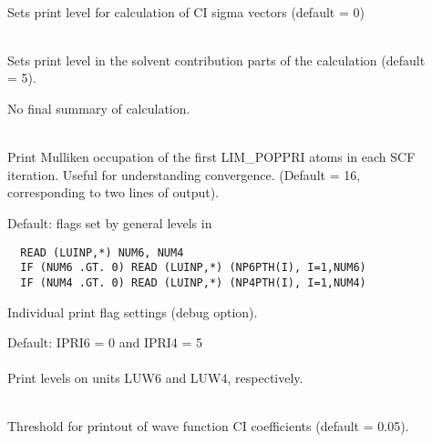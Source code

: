 \begin{description}
\item[]
   \\
  Sets print level for calculation of CI sigma vectors (default = 0)

\item[]
   \\
  Sets print level in the solvent contribution parts of the
  calculation (default = 5).

\item[]
  No final summary of calculation.

\item[]
   \\
  Print Mulliken occupation of the first LIM\_POPPRI atoms in
  each SCF iteration. Useful for understanding convergence.
  (Default = 16, corresponding to two lines of output).

\item[]
 Default: flags set by general levels in 
\begin{verbatim}
  READ (LUINP,*) NUM6, NUM4
  IF (NUM6 .GT. 0) READ (LUINP,*) (NP6PTH(I), I=1,NUM6)
  IF (NUM4 .GT. 0) READ (LUINP,*) (NP4PTH(I), I=1,NUM4)
\end{verbatim}
  Individual print flag settings (debug option).

\item[]
  Default: IPRI6 = 0 and IPRI4 = 5 \\
   \\
  Print levels on units LUW6 and LUW4, respectively.
%
%
\item[]
   \\
  Threshold for printout of wave function CI coefficients (default = 0.05).
 \end{description}



\pagebreak[3]
\subsection{\label{ref-rhfinp}}

